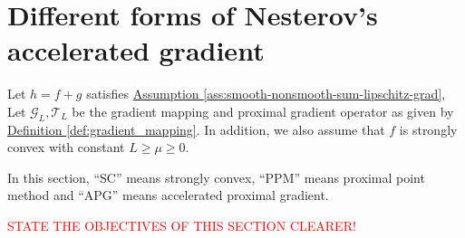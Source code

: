 \documentclass[12pt]{article}
\begin{document}

\section{Different forms of Nesterov's accelerated gradient}\label{sec:different-forms-acc-grad}
    \begin{assumption}\label{ass:smooth-non-smooth-lip-scvx}
        Let $h=f + g$ satisfies 
        \hyperref[ass:smooth-nonsmooth-sum-lipschitz-grad]
        {Assumption \ref*{ass:smooth-nonsmooth-sum-lipschitz-grad}}, 
        Let $\mathcal G_L, \mathcal T_L$ be the gradient mapping and proximal gradient operator as given by 
        \hyperref[def:gradient_mapping]
        {Definition \ref*{def:gradient_mapping}}. 
        In addition, we also assume that $f$ is strongly convex with constant $L \ge \mu \ge 0$. 
    \end{assumption}
        In this section, ``SC'' means strongly convex, ``PPM'' means proximal point method and ``APG'' means accelerated proximal gradient. 
        
        \textcolor{red}{STATE THE OBJECTIVES OF THIS SECTION CLEARER!}
        
\end{document}
